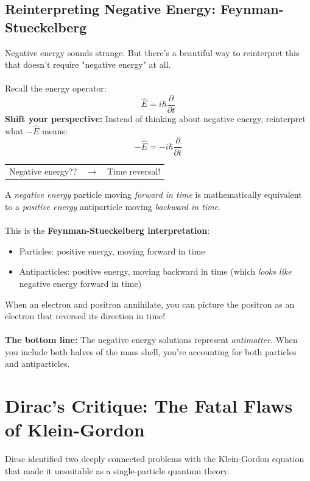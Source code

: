 \documentclass{report}
\begin{document}
\subsection{Reinterpreting Negative Energy: Feynman-Stueckelberg}
Negative energy sounds strange. But there's a beautiful way to reinterpret this that doesn't require "negative energy" at all.\\
\\
Recall the energy operator:
\begin{equation}
	\hat{E} = i\hbar \frac{\partial}{\partial t}
\end{equation}
\textbf{Shift your perspective:} Instead of thinking about negative energy, reinterpret what $-\hat{E}$ means:
\begin{equation}
	-\hat{E} = -i\hbar \frac{\partial}{\partial t}
\end{equation}
\begin{center}
	\begin{tabular}{c c c}
		Negative energy?? & $\longrightarrow$ & Time reversal! \\
	\end{tabular}
\end{center}
\vspace{1em}
A \textit{negative energy} particle moving \textit{forward in time} is mathematically equivalent to a \textit{positive energy} antiparticle moving \textit{backward in time}.\\
\\
This is the \textbf{Feynman-Stueckelberg interpretation}:
\begin{itemize}
	\item Particles: positive energy, moving forward in time
	\item Antiparticles: positive energy, moving backward in time (which \textit{looks like} negative energy forward in time)
\end{itemize}
When an electron and positron annihilate, you can picture the positron as an electron that reversed its direction in time!\\
\\
\textbf{The bottom line:} The negative energy solutions represent \textit{antimatter}. When you include both halves of the mass shell, you're accounting for both particles and antiparticles.

\section{Dirac's Critique: The Fatal Flaws of Klein-Gordon}
Dirac identified two deeply connected problems with the Klein-Gordon equation that made it unsuitable as a single-particle quantum theory.
\end{document}
